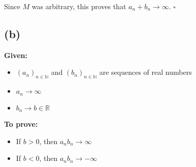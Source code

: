 \documentclass[12pt,a4paper]{article}
\theoremstyle{definition}
\theoremstyle{remark}
\begin{document}
Since $M$ was arbitrary, this proves that $a_n + b_n \to \infty$. $\square$


\subsection*{(b)}

\textbf{Given:} 
\begin{itemize}
    \item $(a_n)_{n\in\mathbb{N}}$ and $(b_n)_{n\in\mathbb{N}}$ are sequences of real numbers
    \item $a_n \to \infty$
    \item $b_n \to b \in \mathbb{R}$
\end{itemize}

\textbf{To prove:} 
\begin{itemize}
    \item If $b > 0$, then $a_n b_n \to \infty$
    \item If $b < 0$, then $a_n b_n \to -\infty$
\end{itemize}
\end{document}
